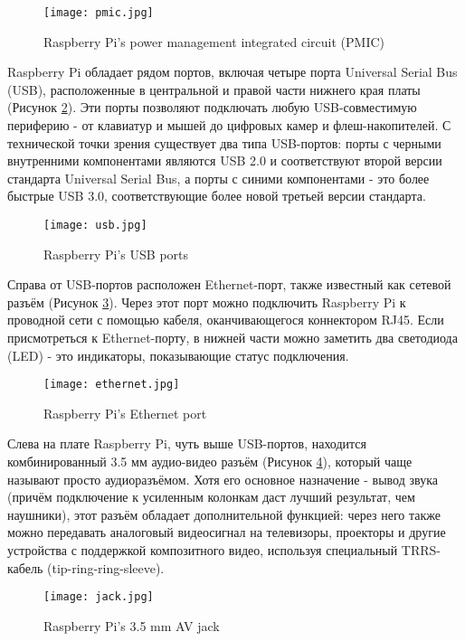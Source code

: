 \begin{figure}[H]
	\centering
	\texttt{[image: pmic.jpg]}
	\caption{Raspberry Pi’s power management integrated circuit (PMIC)}
	\label{fig:pmic}
\end{figure}

Raspberry Pi обладает рядом портов, включая четыре порта Universal Serial Bus (USB), расположенные в центральной и правой части нижнего края платы (Рисунок \ref{fig:usb}). Эти порты позволяют подключать любую USB-совместимую периферию - от клавиатур и мышей до цифровых камер и флеш-накопителей. С технической точки зрения существует два типа USB-портов: порты с черными внутренними компонентами являются USB 2.0 и соответствуют второй версии стандарта Universal Serial Bus, а порты с синими компонентами - это более быстрые USB 3.0, соответствующие более новой третьей версии стандарта.

\begin{figure}[H]
	\centering
	\texttt{[image: usb.jpg]}
	\caption{Raspberry Pi’s USB ports}
	\label{fig:usb}
\end{figure}

Справа от USB-портов расположен Ethernet-порт, также известный как сетевой разъём (Рисунок \ref{fig:ethernet}). Через этот порт можно подключить Raspberry Pi к проводной сети с помощью кабеля, оканчивающегося коннектором RJ45. Если присмотреться к Ethernet-порту, в нижней части можно заметить два светодиода (LED) - это индикаторы, показывающие статус подключения.

\begin{figure}[H]
	\centering
	\texttt{[image: ethernet.jpg]}
	\caption{Raspberry Pi’s Ethernet port}
	\label{fig:ethernet}
\end{figure}

Слева на плате Raspberry Pi, чуть выше USB-портов, находится комбинированный 3.5 мм аудио-видео разъём (Рисунок \ref{fig:jack}), который чаще называют просто аудиоразъёмом. Хотя его основное назначение - вывод звука (причём подключение к усиленным колонкам даст лучший результат, чем наушники), этот разъём обладает дополнительной функцией: через него также можно передавать аналоговый видеосигнал на телевизоры, проекторы и другие устройства с поддержкой композитного видео, используя специальный TRRS-кабель (tip-ring-ring-sleeve).

\begin{figure}[H]
	\centering
	\texttt{[image: jack.jpg]}
	\caption{Raspberry Pi’s 3.5 mm AV jack}
	\label{fig:jack}
\end{figure}


